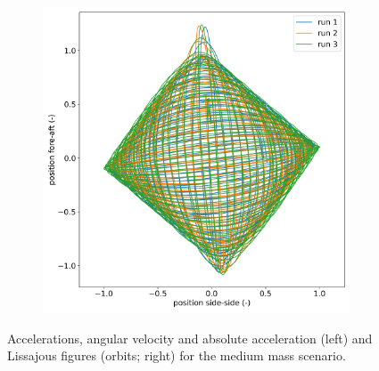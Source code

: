 \documentclass{article}
\begin{document}
\begin{figure}
\begin{subfigure}[b]{0.45\textwidth}
        \includegraphics[width=\textwidth]{../results/experiment/medium_mass_orbit.png}
    \end{subfigure}
    
    \caption{Accelerations, angular velocity and absolute acceleration (left) and Lissajous figures (orbits; right) for the medium mass scenario.}
    \label{fig:medium-mass}
\end{figure}

\end{document}
